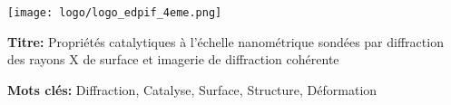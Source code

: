 \Ifthispageodd{\newpage\thispagestyle{empty}\null\newpage}{}
\thispagestyle{empty}
\selectfont

\lhead{}
\rhead{}
\rfoot{}
\cfoot{}
\lfoot{}

\noindent 
\texttt{[image: logo/logo\_edpif\_4eme.png]}
\vspace{0.5cm}
\selectfont

\small

\begin{mdframed}[linecolor=Prune,linewidth=1]

\textbf{Titre:} Propriétés catalytiques à l’échelle nanométrique sondées par diffraction des rayons X de surface et imagerie de diffraction cohérente

\noindent \textbf{Mots clés:} Diffraction, Catalyse, Surface, Structure, Déformation


\end{mdframed}
